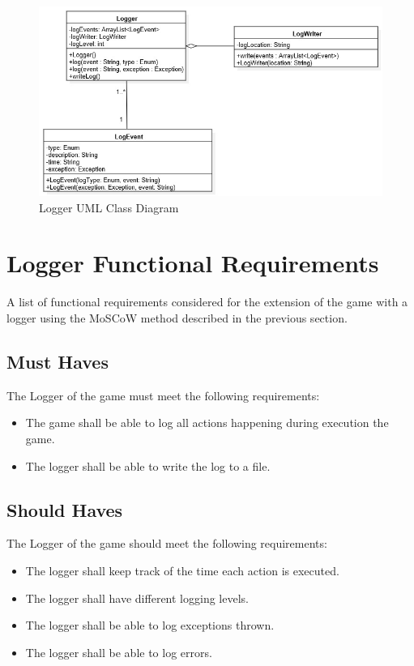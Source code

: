 \documentclass[10pt]{article}
\begin{document}
\begin{figure}[ht!]
\includegraphics[width=1.1\textwidth]{LoggerUML.jpg}
\caption{Logger UML Class Diagram}
\end{figure}
\newpage

 \clearpage
\section*{Logger Functional Requirements}

A list of functional requirements considered for the extension of the game with a logger using the MoSCoW method described in the previous section.

\subsection*{Must Haves}
The Logger of the game must meet the following requirements:
\begin{itemize}
	\item The game shall be able to log all actions happening during execution the game.
	\item The logger shall be able to write the log to a file.
\end{itemize}

\subsection*{Should Haves}
The Logger of the game  should meet the following requirements:
\begin{itemize}
	\item The logger shall keep track of the time each action is executed.
	\item The logger shall have different logging levels.
	\item The logger shall be able to log exceptions thrown.
	\item The logger shall be able to log errors.
\end{itemize}
\end{document}
